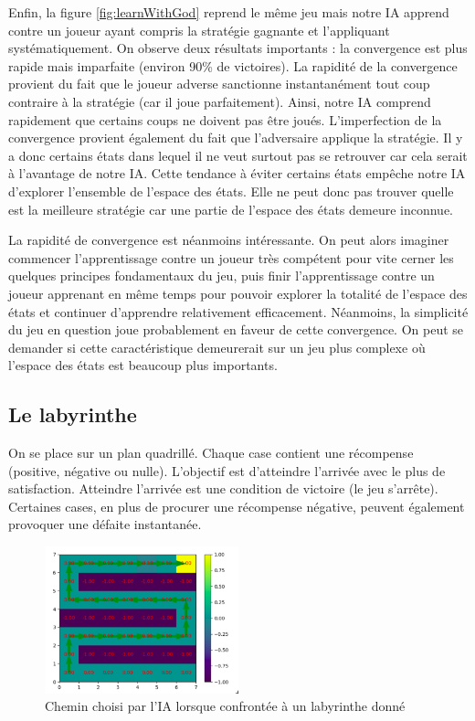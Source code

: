 Enfin, la figure \ref{fig:learnWithGod} reprend le même jeu mais notre IA apprend contre un joueur ayant compris la stratégie gagnante et l'appliquant systématiquement.
On observe deux résultats importants : la convergence est plus rapide mais imparfaite (environ 90\% de victoires). La rapidité de la convergence provient du fait
que le joueur adverse sanctionne instantanément tout coup contraire à la stratégie (car il joue parfaitement). Ainsi, notre IA comprend rapidement que certains coups 
ne doivent pas être joués. L'imperfection de la convergence provient également du fait que l'adversaire applique la stratégie. Il y a donc certains états dans lequel
il ne veut surtout pas se retrouver car cela serait à l'avantage de notre IA. Cette tendance à éviter certains états empêche notre IA d'explorer l'ensemble de l'espace 
des états. Elle ne peut donc pas trouver quelle est la meilleure stratégie car une partie de l'espace des états demeure inconnue.

La rapidité de convergence est néanmoins intéressante. On peut alors imaginer commencer l'apprentissage contre un joueur très compétent pour vite cerner les quelques
principes fondamentaux du jeu, puis finir l'apprentissage contre un joueur apprenant en même temps pour pouvoir explorer la totalité de l'espace des états et continuer
d'apprendre relativement efficacement. Néanmoins, la simplicité du jeu en question joue probablement en faveur de cette convergence. On peut se demander si cette 
caractéristique demeurerait sur un jeu plus complexe où l'espace des états est beaucoup plus importants.


\subsection{Le labyrinthe}

On se place sur un plan quadrillé. Chaque case contient une récompense (positive, négative ou nulle). L'objectif est d'atteindre l'arrivée avec le plus de satisfaction.
Atteindre l'arrivée est une condition de victoire (le jeu s'arrête). Certaines cases, en plus de procurer une récompense négative, peuvent également provoquer une 
défaite instantanée. 

\begin{figure}[h]
 \centering
 \includegraphics[width = 0.5\textwidth]{img/labyrinthe.png}
 \caption{Chemin choisi par l'IA lorsque confrontée à un labyrinthe donné}
 \label{fig:labyrinthe}
\end{figure}


